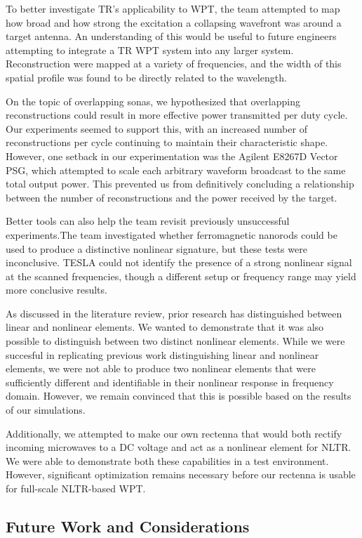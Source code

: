 To better investigate TR's applicability to WPT, the team attempted to map how broad and how strong the excitation a collapsing wavefront was around a target antenna. An understanding of this would be useful to future engineers attempting to integrate a TR WPT system into any larger system. Reconstruction were mapped at a variety of frequencies, and the width of this spatial profile was found to be directly related to the wavelength.

On the topic of overlapping sonas, we hypothesized that overlapping reconstructions could result in more effective power transmitted per duty cycle. Our experiments seemed to support this, with an increased number of reconstructions per cycle continuing to maintain their characteristic shape. However, one setback in our experimentation was the Agilent E8267D Vector PSG, which attempted to scale each arbitrary waveform  broadcast to the same total output power. This prevented us from definitively concluding a relationship between the number of reconstructions and the power received by the target.

Better tools can also help the team revisit previously unsuccessful experiments.The team investigated whether ferromagnetic nanorods could be used to produce a distinctive nonlinear signature, but these tests were inconclusive. TESLA could not identify the presence of a strong nonlinear signal at the scanned frequencies, though a different setup or frequency range may yield more conclusive results. 

As discussed in the literature review, prior research has distinguished between linear and nonlinear elements. We wanted to demonstrate that it was also possible to distinguish between two distinct nonlinear elements. While we were succesful in replicating previous work distinguishing linear and nonlinear elements, we were not able to produce two nonlinear elements that were sufficiently different and identifiable in their nonlinear response in frequency domain. However, we remain convinced that this is possible based on the results of our simulations.

Additionally, we attempted to make our own rectenna that would both rectify incoming microwaves to a DC voltage and act as a nonlinear element for NLTR. We were able to demonstrate both these capabilities in a test environment. However, significant optimization remains necessary before our rectenna is usable for full-scale NLTR-based WPT.


\subsection{Future Work and Considerations}

